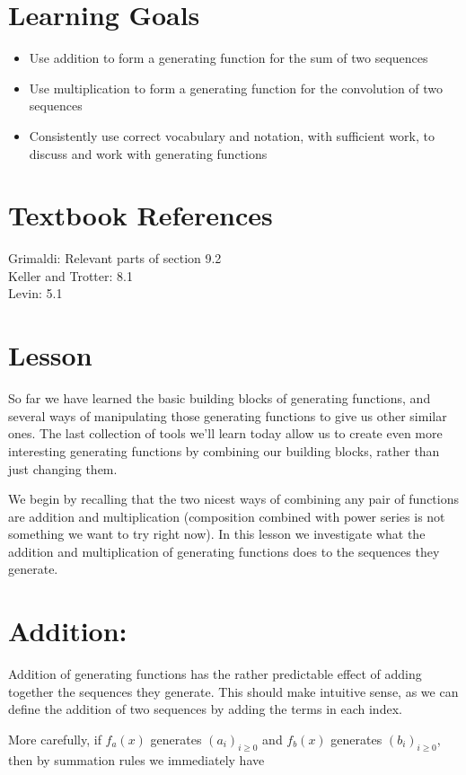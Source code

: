 \documentclass{article}
\begin{document}
\section*{Learning Goals}
\begin{itemize}
  \item Use addition to form a generating function for the sum of two sequences
  \item Use multiplication to form a generating function for the convolution of two sequences
  \item Consistently use correct vocabulary and notation, with sufficient work, to discuss and work with generating functions
\end{itemize}

\section*{Textbook References}
Grimaldi: Relevant parts of section 9.2\\
Keller and Trotter: 8.1\\
Levin: 5.1

\section*{Lesson}
So far we have learned the basic building blocks of generating functions, and several ways of manipulating those generating functions to give us other similar ones. The last collection of tools we'll learn today allow us to create even more interesting generating functions by combining our building blocks, rather than just changing them.

We begin by recalling that the two nicest ways of combining any pair of functions are addition and multiplication (composition combined with power series is not something we want to try right now). In this lesson we investigate what the addition and multiplication of generating functions does to the sequences they generate.

\section*{Addition:}
Addition of generating functions has the rather predictable effect of adding together the sequences they generate. This should make intuitive sense, as we can define the addition of two sequences by adding the terms in each index.

More carefully, if $f_{a}(x)$ generates $\left(a_{i}\right)_{i \geq 0}$ and $f_{b}(x)$ generates $\left(b_{i}\right)_{i \geq 0}$, then by summation rules we immediately have
\end{document}
